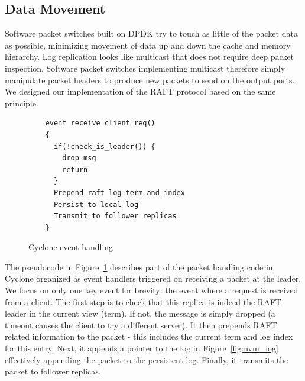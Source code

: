 \documentclass[pageno]{jpaper}
\begin{document}
\subsection{Data Movement}
\label{sec:dm}
Software packet switches built on DPDK try to touch as little of the packet data
as possible, minimizing movement of data up and down the cache and memory
hierarchy. Log replication looks like multicast that does not require deep
packet inspection. Software packet switches implementing multicast therefore
simply manipulate packet headers to produce new packets to send on the output
ports. We designed our implementation of the RAFT protocol based on the same
principle.

\begin{figure}
\begin{verbatim}
    event_receive_client_req()
    {
      if(!check_is_leader()) {
        drop_msg
        return
      }
      Prepend raft log term and index
      Persist to local log
      Transmit to follower replicas
    }
\end{verbatim}
\caption{Cyclone event handling}
\label{fig:control_plane}
\end{figure}


The pseudocode in Figure~\ref{fig:control_plane} describes part of the packet
handling code in Cyclone organized as event handlers triggered on receiving a
packet at the leader. We focus on only one key event for brevity: the event
where a request is received from a client. The first step is to check that this
replica is indeed the RAFT leader in the current view (term). If not, the
message is simply dropped (a timeout causes the client to try a different
server). It then prepends RAFT related information to the packet - this includes
the current term and log index for this entry. Next, it appends a pointer to the
log in Figure~\ref{fig:nvm_log} effectively appending the packet to the
persistent log. Finally, it transmits the packet to follower replicas.
\end{document}
